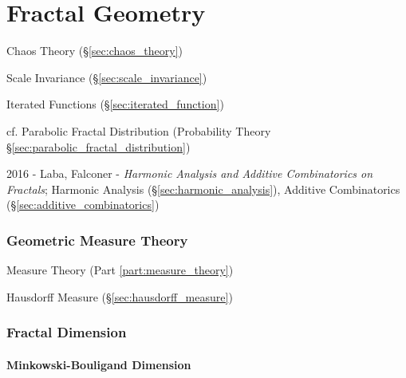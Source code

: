 \part{Fractal Geometry}\label{sec:fractal_geometry}

Chaos Theory (\S\ref{sec:chaos_theory})

Scale Invariance (\S\ref{sec:scale_invariance})

Iterated Functions (\S\ref{sec:iterated_function})

cf. Parabolic Fractal Distribution (Probability Theory
\S\ref{sec:parabolic_fractal_distribution})

2016 - Laba, Falconer - \emph{Harmonic Analysis and Additive Combinatorics on
  Fractals}; Harmonic Analysis (\S\ref{sec:harmonic_analysis}), Additive
Combinatorics (\S\ref{sec:additive_combinatorics})



\section{Geometric Measure Theory}\label{sec:geometric_measure_theory}

\fist Measure Theory (Part \ref{part:measure_theory})

\fist Hausdorff Measure (\S\ref{sec:hausdorff_measure})



\section{Fractal Dimension}\label{sec:fractal_dimension}

\subsection{Minkowski-Bouligand Dimension}
\label{sec:minkowski_bouligand}

